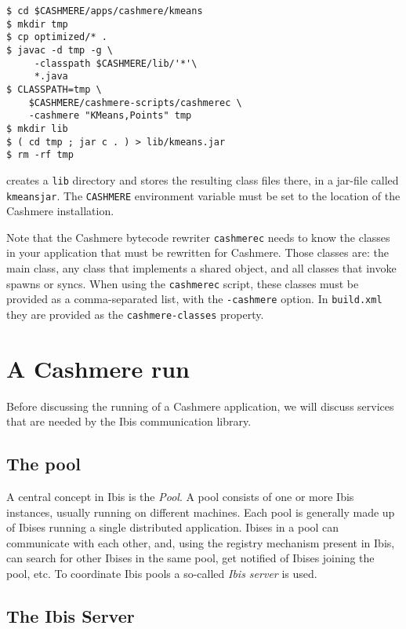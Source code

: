 \documentclass[a4paper,10pt]{article}
\begin{document}
\begin{verbatim}
$ cd $CASHMERE/apps/cashmere/kmeans
$ mkdir tmp
$ cp optimized/* .
$ javac -d tmp -g \
     -classpath $CASHMERE/lib/'*'\
     *.java
$ CLASSPATH=tmp \
    $CASHMERE/cashmere-scripts/cashmerec \
    -cashmere "KMeans,Points" tmp
$ mkdir lib
$ ( cd tmp ; jar c . ) > lib/kmeans.jar
$ rm -rf tmp
\end{verbatim}

creates a \texttt{lib} directory and stores the resulting class files there,
in a jar-file called \texttt{kmeansjar}.
The \texttt{CASHMERE} environment variable must be set to the location of
the Cashmere installation.

Note that the Cashmere bytecode rewriter \texttt{cashmerec} needs to know the
classes in your application that must be rewritten for Cashmere.
Those classes are: the main class, any class that implements a shared object,
and all classes that invoke spawns or syncs.
When using the \texttt{cashmerec} script, these classes must be provided as
a comma-separated list, with the \texttt{-cashmere} option. In
\texttt{build.xml} they are provided as the \texttt{cashmere-classes} property.

\section{A Cashmere run}

Before discussing
the running of a Cashmere application, we will discuss services that are
needed by the Ibis communication library.

\subsection{The pool}

A central concept in Ibis is the \emph{Pool}. A pool consists of one or
more Ibis instances, usually running on different machines. Each pool is
generally made up of Ibises running a single distributed application.
Ibises in a pool can communicate with each other, and, using the
registry mechanism present in Ibis, can search for other Ibises in the
same pool, get notified of Ibises joining the pool, etc. To
coordinate Ibis pools a so-called \emph{Ibis server} is used.

\subsection{The Ibis Server}
\end{document}
